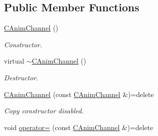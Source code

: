 \subsection*{Public Member Functions}
\begin{DoxyCompactItemize}
\item 
\hypertarget{class_c_anim_channel_a1ce8a3d902476227d112459b662e2a4f}{\hyperlink{class_c_anim_channel_a1ce8a3d902476227d112459b662e2a4f}{C\+Anim\+Channel} ()}\label{class_c_anim_channel_a1ce8a3d902476227d112459b662e2a4f}

\begin{DoxyCompactList}\small\item\em Constructor. \end{DoxyCompactList}\item 
\hypertarget{class_c_anim_channel_a63a09f6e3f729b16130405f865c8f267}{virtual \hyperlink{class_c_anim_channel_a63a09f6e3f729b16130405f865c8f267}{$\sim$\+C\+Anim\+Channel} ()}\label{class_c_anim_channel_a63a09f6e3f729b16130405f865c8f267}

\begin{DoxyCompactList}\small\item\em Destructor. \end{DoxyCompactList}\item 
\hypertarget{class_c_anim_channel_aeb50ddc731a16230beef39cf198b78f9}{\hyperlink{class_c_anim_channel_aeb50ddc731a16230beef39cf198b78f9}{C\+Anim\+Channel} (const \hyperlink{class_c_anim_channel}{C\+Anim\+Channel} \&)=delete}\label{class_c_anim_channel_aeb50ddc731a16230beef39cf198b78f9}

\begin{DoxyCompactList}\small\item\em Copy constructor disabled. \end{DoxyCompactList}\item 
\hypertarget{class_c_anim_channel_a29ee3e3b8f1edf5947c08a6aad1d5bcd}{void \hyperlink{class_c_anim_channel_a29ee3e3b8f1edf5947c08a6aad1d5bcd}{operator=} (const \hyperlink{class_c_anim_channel}{C\+Anim\+Channel} \&)=delete}\label{class_c_anim_channel_a29ee3e3b8f1edf5947c08a6aad1d5bcd}


\end{DoxyCompactItemize}
